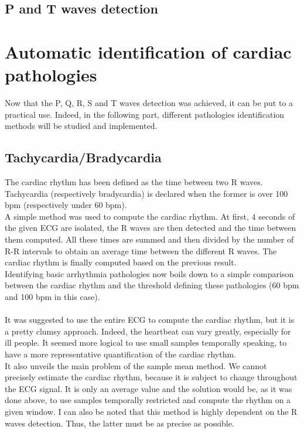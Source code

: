 \documentclass[11pt]{article}
\begin{document}
	\subsection{P and T waves detection}
		


\section{Automatic identification of cardiac pathologies}
	Now that the P, Q, R, S and T waves detection was achieved, it can be put to a practical use. Indeed, in the following part, different pathologies identification methods will be studied and implemented.
	\subsection{Tachycardia/Bradycardia}
		The cardiac rhythm has been defined as the time between two R waves. Tachycardia (respectively bradycardia) is declared when the former is over 100 bpm (respectively under 60 bpm).\\
		A simple method was used to compute the cardiac rhythm. At first, 4 seconds of the given ECG are isolated, the R waves are then detected and the time between them computed. All these times are summed and then divided by the number of R-R intervals to obtain an average time between the different R waves. The cardiac rhythm is finally computed based on the previous result. \\
		Identifying basic arrhythmia pathologies now boils down to a simple comparison between the cardiac rhythm and the threshold defining these pathologies (60 bpm and 100 bpm in this case).\\
		\\
		It was suggested to use the entire ECG to compute the cardiac rhythm, but it is a pretty clumsy approach. Indeed, the heartbeat can vary greatly, especially for ill people. It seemed more logical to use small samples temporally speaking, to have a more representative quantification of the cardiac rhythm.\\
		It also unveils the main problem of the sample mean method. We cannot precisely estimate the cardiac rhythm, because it is subject to change throughout the ECG signal. It is only an average value and the solution would be, as it was done above, to use samples temporally restricted and compute the rhythm on a given window.
		I can also be noted that this method is highly dependent on the R waves detection. Thus, the latter must be as precise as possible.
\end{document}
